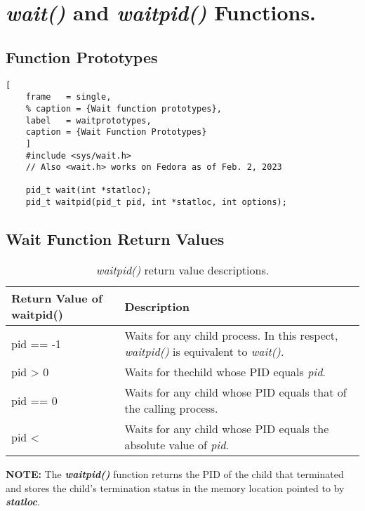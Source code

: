 \documentclass{article}
\newcommand\be[1]{\textbf{\emph{#1}}}
\begin{document}
\section{\be{wait()} and \be{waitpid()} Functions.}
\subsection{Function Prototypes}
\begin{lstlisting}[
    frame   = single,
    % caption = {Wait function prototypes},
    label   = waitprototypes,
    caption = {Wait Function Prototypes}
    ]
    #include <sys/wait.h>
    // Also <wait.h> works on Fedora as of Feb. 2, 2023

    pid_t wait(int *statloc);
    pid_t waitpid(pid_t pid, int *statloc, int options);
\end{lstlisting}

\subsection{Wait Function Return Values}
\begin{center}
    \begin{table}[h!]
        \begin{tabular}{|l|l|}
            \hline
            Return Value of waitpid() & Description \\
            \hline
            pid == -1             & Waits for any child process. In this respect,
                                 \emph{waitpid()} is equivalent to \emph{wait()}. \\
            \hline 
            pid \textgreater{} 0  & Waits for thechild whose PID equals \emph{pid}. \\
            \hline
            pid == 0              & Waits for any child whose PID equals that of the calling process. \\
            \hline
            pid \textless         & Waits for any child whose PID equals the absolute value of \emph{pid}. \\
            \hline
        \end{tabular}
        \caption{\emph{waitpid()} return value descriptions.}
        \label{waitpidreturnvalues}
    \end{table}
\end{center}

\textbf{NOTE:} The \be{waitpid()} function returns the PID of the child that terminated and stores the child's 
termination status in the memory location pointed to by \be{statloc}.\newline
\end{document}

